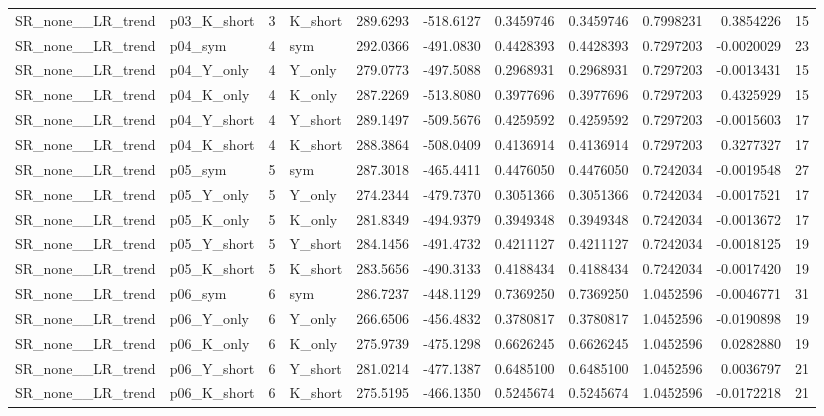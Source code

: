 \begin{table}[!h]
\begin{tabular}[t]{llrlrrrrrrr}
SR\_none\_\_LR\_trend & p03\_K\_short & 3 & K\_short & 289.6293 & -518.6127 & 0.3459746 & 0.3459746 & 0.7998231 & 0.3854226 & 15\\
\addlinespace
SR\_none\_\_LR\_trend & p04\_sym & 4 & sym & 292.0366 & -491.0830 & 0.4428393 & 0.4428393 & 0.7297203 & -0.0020029 & 23\\
SR\_none\_\_LR\_trend & p04\_Y\_only & 4 & Y\_only & 279.0773 & -497.5088 & 0.2968931 & 0.2968931 & 0.7297203 & -0.0013431 & 15\\
SR\_none\_\_LR\_trend & p04\_K\_only & 4 & K\_only & 287.2269 & -513.8080 & 0.3977696 & 0.3977696 & 0.7297203 & 0.4325929 & 15\\
SR\_none\_\_LR\_trend & p04\_Y\_short & 4 & Y\_short & 289.1497 & -509.5676 & 0.4259592 & 0.4259592 & 0.7297203 & -0.0015603 & 17\\
SR\_none\_\_LR\_trend & p04\_K\_short & 4 & K\_short & 288.3864 & -508.0409 & 0.4136914 & 0.4136914 & 0.7297203 & 0.3277327 & 17\\
\addlinespace
SR\_none\_\_LR\_trend & p05\_sym & 5 & sym & 287.3018 & -465.4411 & 0.4476050 & 0.4476050 & 0.7242034 & -0.0019548 & 27\\
SR\_none\_\_LR\_trend & p05\_Y\_only & 5 & Y\_only & 274.2344 & -479.7370 & 0.3051366 & 0.3051366 & 0.7242034 & -0.0017521 & 17\\
SR\_none\_\_LR\_trend & p05\_K\_only & 5 & K\_only & 281.8349 & -494.9379 & 0.3949348 & 0.3949348 & 0.7242034 & -0.0013672 & 17\\
SR\_none\_\_LR\_trend & p05\_Y\_short & 5 & Y\_short & 284.1456 & -491.4732 & 0.4211127 & 0.4211127 & 0.7242034 & -0.0018125 & 19\\
SR\_none\_\_LR\_trend & p05\_K\_short & 5 & K\_short & 283.5656 & -490.3133 & 0.4188434 & 0.4188434 & 0.7242034 & -0.0017420 & 19\\
\addlinespace
SR\_none\_\_LR\_trend & p06\_sym & 6 & sym & 286.7237 & -448.1129 & 0.7369250 & 0.7369250 & 1.0452596 & -0.0046771 & 31\\
SR\_none\_\_LR\_trend & p06\_Y\_only & 6 & Y\_only & 266.6506 & -456.4832 & 0.3780817 & 0.3780817 & 1.0452596 & -0.0190898 & 19\\
SR\_none\_\_LR\_trend & p06\_K\_only & 6 & K\_only & 275.9739 & -475.1298 & 0.6626245 & 0.6626245 & 1.0452596 & 0.0282880 & 19\\
SR\_none\_\_LR\_trend & p06\_Y\_short & 6 & Y\_short & 281.0214 & -477.1387 & 0.6485100 & 0.6485100 & 1.0452596 & 0.0036797 & 21\\
SR\_none\_\_LR\_trend & p06\_K\_short & 6 & K\_short & 275.5195 & -466.1350 & 0.5245674 & 0.5245674 & 1.0452596 & -0.0172218 & 21\\

\end{tabular}
\end{table}
